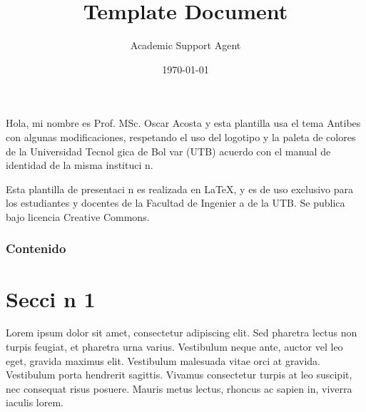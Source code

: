 \documentclass{article}
\title{Template Document}
\author{Academic Support Agent}
\date{\today}
\begin{document}
\maketitle

\begin{frame}[plain]
		\titlepage
	\end{frame}
	
	\begin{frame}
		\justifying
		\hspace*{20pt} Hola, mi nombre es Prof. MSc. Oscar Acosta y esta plantilla usa el tema Antibes con algunas modificaciones, respetando el uso del logotipo y la paleta de colores de la Universidad Tecnol gica de Bol var (UTB) acuerdo con el manual de identidad de la misma instituci n.
		
		\hspace*{20pt} Esta plantilla de presentaci n es realizada en \LaTeX, y es de uso exclusivo para los estudiantes y docentes de la Facultad de Ingenier a de la UTB. Se publica bajo licencia Creative Commons.
	\end{frame}
	
	\begin{frame}
		\frametitle{Contenido}
		
	\end{frame}
	
	\AtBeginSection[]
	{
		\begin{frame}
			\frametitle{Contenido}
			
		\end{frame}
	}
	
	
	\section{Secci n 1}
	
	\begin{frame}
		Lorem ipsum dolor sit amet, consectetur adipiscing elit. Sed pharetra lectus non turpis feugiat, et pharetra urna varius. Vestibulum neque ante, auctor vel leo eget, gravida maximus elit. Vestibulum malesuada vitae orci at gravida. Vestibulum porta hendrerit sagittis. Vivamus consectetur turpis at leo suscipit, nec consequat risus posuere. Mauris metus lectus, rhoncus ac sapien in, viverra iaculis lorem.
	\end{frame}
	
\end{document}
